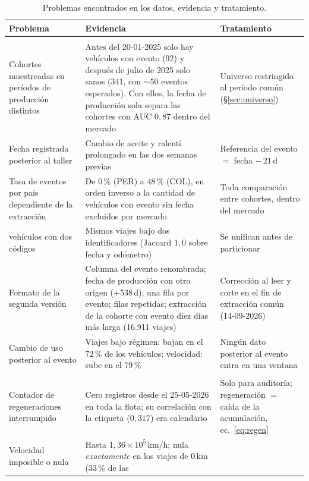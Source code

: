 \begin{table}[!htbp]
\centering
\caption{Problemas encontrados en los datos, evidencia y tratamiento.}
\label{tab:trampas}
\footnotesize
\begin{tabularx}{\textwidth}{@{}>{\raggedright\arraybackslash}p{3.1cm}>{\raggedright\arraybackslash}X>{\raggedright\arraybackslash}p{4.3cm}@{}}
\toprule
Problema & Evidencia & Tratamiento \\
\midrule
\multicolumn{3}{@{}l}{\textit{Muestreo y etiqueta}} \\
Cohortes muestreadas en períodos de producción distintos & Antes del 20-01-2025 solo hay vehículos con evento (92) y
  después de julio de 2025 solo sanos (341, con $\sim 50$ eventos esperados). Con ellos, la fecha de producción sola
  separa las cohortes con AUC $0{,}87$ dentro del mercado & Universo restringido al período común
  (\S\ref{sec:universo}) \\
Fecha registrada posterior al taller & Cambio de aceite y ralentí prolongado en las dos semanas previas & Referencia del
  evento $=$ fecha $-\,21$\,d \\
Tasa de eventos por país dependiente de la extracción & De $0\,\%$ (PER) a $48\,\%$ (COL), en orden inverso a la cantidad de
  vehículos con evento sin fecha excluidos por mercado & Toda comparación entre cohortes, dentro del mercado \\
13 vehículos con dos códigos & Mismos viajes bajo dos identificadores (Jaccard $1{,}0$ sobre fecha y odómetro) & Se
  unifican antes de particionar \\
Formato de la segunda versión & Columna del evento renombrada; fecha de producción con otro origen ($+538$\,d); una fila
  por evento; filas repetidas; extracción de la cohorte con evento diez días más larga (16.911 viajes) & Corrección al leer
  y corte en el fin de extracción común (14-09-2026) \\
Cambio de uso posterior al evento & Viajes bajo régimen: bajan en el $72\,\%$ de los vehículos; velocidad: sube en el
  $79\,\%$ & Ningún dato posterior al evento entra en una ventana \\
\midrule
\multicolumn{3}{@{}l}{\textit{Columnas, faltantes y atípicos}} \\
Contador de regeneraciones interrumpido & Cero registros desde el 25-05-2026 en toda la flota; su correlación con la
  etiqueta ($0{,}317$) era calendario & Solo para auditoría; regeneración $=$ caída de la acumulación,
  ec.~\eqref{eq:regen} \\
Velocidad imposible o nula & Hasta $1{,}36\times10^5$\,km/h; nula \emph{exactamente} en los viajes de 0\,km ($33\,\%$ de las

\end{tabularx}
\end{table}
